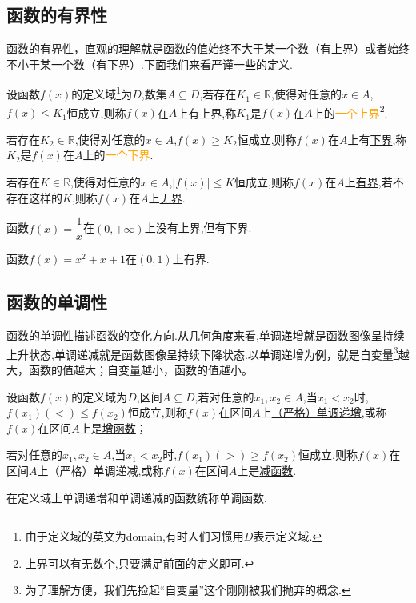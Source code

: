 \documentclass[lang=cn,math=cm,chinesefont=nofont,11pt,scheme=chinese,twocol]{elegantbook}
\begin{document}
\subsection{函数的有界性}

函数的有界性，直观的理解就是函数的值始终不大于某一个数（有上界）或者始终不小于某一个数（有下界）.下面我们来看严谨一些的定义.

\begin{definition}
  设函数$f(x)$的定义域\footnote{由于定义域的英文为domain,有时人们习惯用$D$表示定义域.}为$D$,数集$A\subseteq D$,若存在$K_1\in\mathbb{R}$,使得对任意的$x\in A$,$f(x)\leqslant K_1$恒成立,则称$f(x)$在$A$上有\underline{上界},称$K_1$是$f(x)$在$A$上的\textcolor{orange}{一个上界}\footnote{上界可以有无数个,只要满足前面的定义即可.}.

  若存在$K_2\in\mathbb{R}$,使得对任意的$x\in A$,$f(x)\geqslant K_2$恒成立,则称$f(x)$在$A$上有\underline{下界},称$K_2$是$f(x)$在$A$上的\textcolor{orange}{一个下界}.

  若存在$K\in\mathbb{R}$,使得对任意的$x\in A$,$\left|f(x)\right|\leqslant K$恒成立,则称$f(x)$在$A$上\underline{有界},若不存在这样的$K$,则称$f(x)$在$A$上\underline{无界}.
\end{definition}

\begin{example}
  函数$f(x)=\dfrac1x$在$(0,+\infty)$上没有上界,但有下界.
\end{example}

\begin{example}
  函数$f(x)=x^2+x+1$在$(0,1)$上有界.
\end{example}

\subsection{函数的单调性}

函数的单调性描述函数的变化方向.从几何角度来看,单调递增就是函数图像呈持续上升状态,单调递减就是函数图像呈持续下降状态.以单调递增为例，就是自变量\footnote{为了理解方便，我们先捡起“自变量”这个刚刚被我们抛弃的概念.}越大，函数的值越大；自变量越小，函数的值越小。

\begin{definition}
  设函数$f(x)$的定义域为$D$,区间$A\subseteq D$,若对任意的$x_1,x_2\in A$,当$x_1<x_2$时,$f(x_1)(<)\leqslant f(x_2)$恒成立,则称$f(x)$在区间$A$上\underline{（严格）单调递增},或称$f(x)$在区间$A$上是\underline{增函数}；

  若对任意的$x_1,x_2\in A$,当$x_1<x_2$时,$f(x_1)(>)\geqslant f(x_2)$恒成立,则称$f(x)$在区间$A$上（严格）单调递减,或称$f(x)$在区间$A$上是\underline{减函数}.

  在定义域上单调递增和单调递减的函数统称单调函数.
\end{definition}
\end{document}

